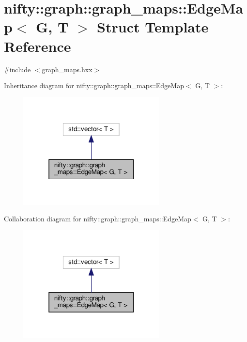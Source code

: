 \hypertarget{structnifty_1_1graph_1_1graph__maps_1_1EdgeMap}{}\section{nifty\+:\+:graph\+:\+:graph\+\_\+maps\+:\+:Edge\+Map$<$ G, T $>$ Struct Template Reference}
\label{structnifty_1_1graph_1_1graph__maps_1_1EdgeMap}


{\ttfamily \#include $<$graph\+\_\+maps.\+hxx$>$}



Inheritance diagram for nifty\+:\+:graph\+:\+:graph\+\_\+maps\+:\+:Edge\+Map$<$ G, T $>$\+:
\nopagebreak
\begin{figure}[H]
\begin{center}
\leavevmode
\includegraphics[width=211pt]{structnifty_1_1graph_1_1graph__maps_1_1EdgeMap__inherit__graph}
\end{center}
\end{figure}


Collaboration diagram for nifty\+:\+:graph\+:\+:graph\+\_\+maps\+:\+:Edge\+Map$<$ G, T $>$\+:
\nopagebreak
\begin{figure}[H]
\begin{center}
\leavevmode
\includegraphics[width=211pt]{structnifty_1_1graph_1_1graph__maps_1_1EdgeMap__coll__graph}
\end{center}
\end{figure}
